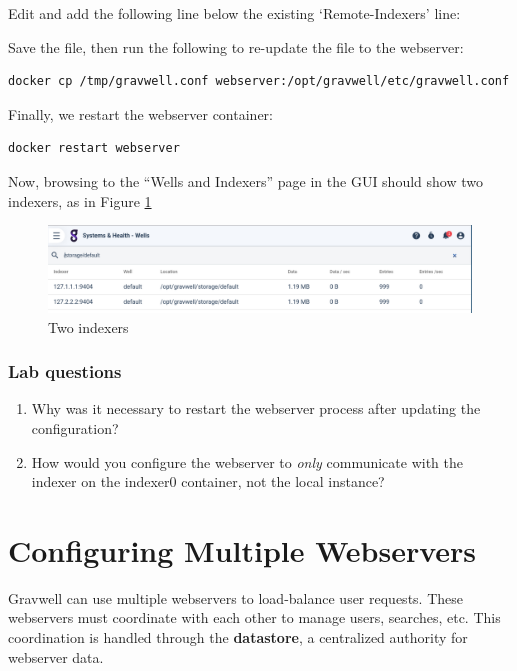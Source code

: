 Edit  and add the following line below the existing `Remote-Indexers' line:


Save the file, then run the following to re-update the file to the webserver:

\begin{Verbatim}[breaklines=true]
docker cp /tmp/gravwell.conf webserver:/opt/gravwell/etc/gravwell.conf
\end{Verbatim}

Finally, we restart the webserver container:

\begin{Verbatim}[breaklines=true]
docker restart webserver
\end{Verbatim}

Now, browsing to the ``Wells and Indexers'' page in the GUI should show
two indexers, as in Figure \ref{fig:twoindexers}

\begin{figure}
	\includegraphics{images/twoindexers.png}
	\caption{Two indexers}
	\label{fig:twoindexers}
\end{figure}

\subsubsection{Lab questions}

\begin{enumerate}
\item
  Why was it necessary to restart the webserver process after updating
  the configuration?
\item
  How would you configure the webserver to \emph{only} communicate with
  the indexer on the indexer0 container, not the local instance?
\end{enumerate}

\section{Configuring Multiple Webservers}
Gravwell can use multiple webservers to load-balance user requests.
These webservers must coordinate with each other to manage users,
searches, etc. This coordination is handled through the \textbf{datastore}, a
centralized authority for webserver data.

